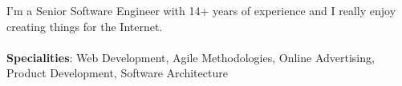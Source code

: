 
\begin{cvparagraph}
I’m a Senior Software Engineer with 14+ years of experience and I really enjoy creating things for the Internet.\\\\
\textbf{Specialities}: Web Development, Agile Methodologies, Online Advertising, Product Development, Software Architecture
\end{cvparagraph}

